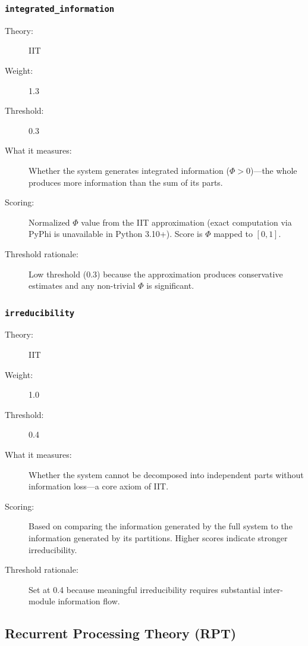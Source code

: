 \subsubsection{\texttt{integrated\_information}}
\begin{description}
  \item[Theory:] IIT \cite{tononi2008}
  \item[Weight:] 1.3
  \item[Threshold:] 0.3
  \item[What it measures:] Whether the system generates integrated information ($\Phi > 0$)---the whole produces more information than the sum of its parts.
  \item[Scoring:] Normalized $\Phi$ value from the IIT approximation (exact computation via PyPhi is unavailable in Python 3.10+). Score is $\Phi$ mapped to $[0, 1]$.
  \item[Threshold rationale:] Low threshold (0.3) because the approximation produces conservative estimates and any non-trivial $\Phi$ is significant.
\end{description}

\subsubsection{\texttt{irreducibility}}
\begin{description}
  \item[Theory:] IIT
  \item[Weight:] 1.0
  \item[Threshold:] 0.4
  \item[What it measures:] Whether the system cannot be decomposed into independent parts without information loss---a core axiom of IIT.
  \item[Scoring:] Based on comparing the information generated by the full system to the information generated by its partitions. Higher scores indicate stronger irreducibility.
  \item[Threshold rationale:] Set at 0.4 because meaningful irreducibility requires substantial inter-module information flow.
\end{description}

\subsection{Recurrent Processing Theory (RPT)}

